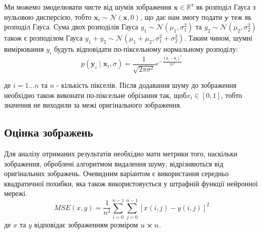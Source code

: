 \documentclass[14pt,a4paper]{extarticle}
\newcounter{e}
\numberwithin{equation}{section}
\numberwithin{figure}{section}
\begin{document}
	Ми можемо змоделювати чисте від шумів зображення $\mathbf{x} \in \mathbb{R}^{т}$ як розподіл Гауса з нульовою дисперсією, тобто $\mathbf{x}_{i} \sim \mathcal{N}(\mathbf{x}, 0)$, що дає нам змогу подати $\mathbf{y}$ теж як розподіл Гауса. Сума двох розподілів Гауса $y_{1} \sim \mathcal{N}\left(\mu_{1}, \sigma_{1}^{2}\right)$ та $y_{2} \sim \mathcal{N}\left(\mu_{2}, \sigma_{2}^{2}\right)$ також є розподілом Гауса $y_{1}+y_{2} \sim \mathcal{N}\left(\mu_{1}+\mu_{2}, \sigma_{1}^{2}+\sigma_{2}^{2}\right)$. Таким чином, шумні  вимірювання $y_{i}$ будуть відповідати по-піксельному нормальному розподілу:
	\begin{equation}
		p\left(\mathbf{y}_{i} \mid \mathbf{x}_{i}, 		\sigma\right)=\frac{1}{\sqrt{2 \pi \sigma^{2}}} e^{-\frac{\left(\mathbf{y}_{i}-\mathbf{x}_{i}\right)^{2}}{2 \sigma^{2}}}
	\end{equation}
	
	де $i = 1\dotsc n$ та $n$ - кількість пікселів. Після додавання шуму до зображення необхідно також виконати по-піксельне обрізання так, щоб$x_i \in [0, 1]$, тобто значення не виходили за межі оригінального зображення.
	
	\subsection{Оцінка зображень}
	Для аналізу отриманих результатів необхідно мати метрики того, наскільки зображення, оброблені алгоритмом видалення шуму,  відрізняються від оригінальних зображень. Очевидним варіантом є використання середньо квадратичної похибки, яка також використовується у штрафній функції нейронної мережі.
	\begin{equation}
		M S E(x, y) =\frac{1}{n^2} \sum_{i=0}^{n-1} \sum_{j=0}^{n-1}[x(i, j)-y(i, j)]^{2}
	\end{equation}
	де $x$ та $y$ відповідає зображенням розміром $n \cross n$.
	
\end{document}

